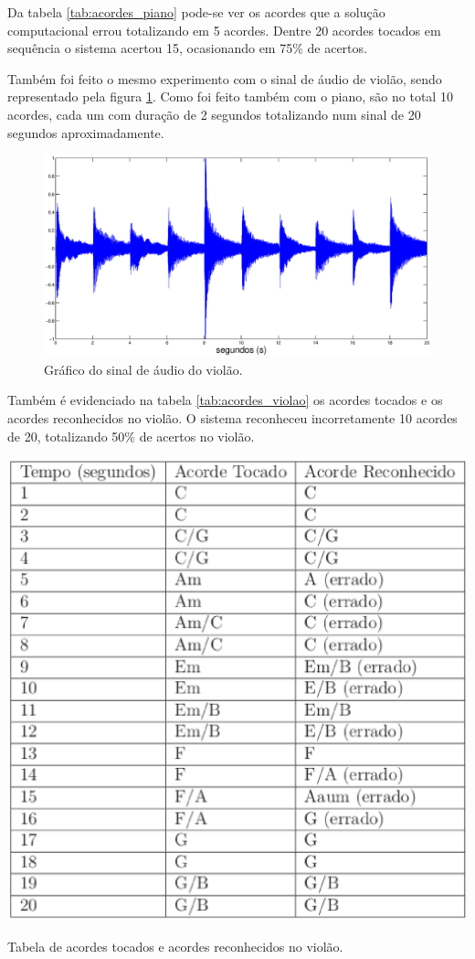 Da tabela \ref{tab:acordes_piano} pode-se ver os acordes que a solução computacional errou totalizando em 5 acordes. Dentre 20 acordes tocados em sequência o sistema acertou 15, ocasionando em 75\% de acertos.

Também foi feito o mesmo experimento com o sinal de áudio de violão, sendo representado pela figura \ref{fig:acordes_violao}. Como foi feito também com o piano, são no total 10 acordes, cada um com duração de 2 segundos totalizando num sinal de 20 segundos aproximadamente.

\begin{figure}[h]
    \centering
    \includegraphics[keepaspectratio=true,scale=0.3]{figuras/acordes_violao.eps}
  \caption{Gráfico do sinal de áudio do violão.}
  \label{fig:acordes_violao}
\end{figure}

\newpage
Também é evidenciado na tabela \ref{tab:acordes_violao} os acordes tocados e os acordes reconhecidos no violão. O sistema reconheceu incorretamente 10 acordes de 20, totalizando 50\% de acertos no violão.

\begin{table}[h]
\centering
    \includegraphics[keepaspectratio=true,scale=0.5]{figuras/tabela_acordes_violao.eps}
  \caption{Tabela de acordes tocados e acordes reconhecidos no violão.}
  \label{tab:acordes_violao}
\end{table}

